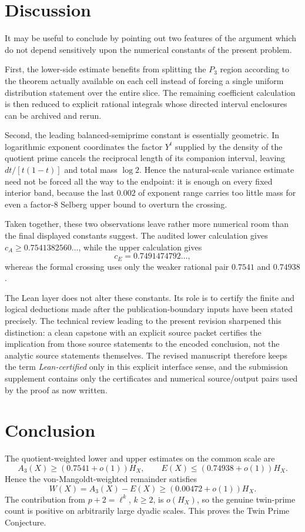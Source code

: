\documentclass{aomart}
\theoremstyle{definition}
\newcommand{\1}{\mathbf 1}
\begin{document}
\section{Discussion}

It may be useful to conclude by pointing out two features of the argument which do not depend sensitively upon the numerical constants of the present problem.

First, the lower-side estimate benefits from splitting the $P_3$ region according to the theorem actually available on each cell instead of forcing a single uniform distribution statement over the entire slice.  The remaining coefficient calculation is then reduced to explicit rational integrals whose directed interval enclosures can be archived and rerun.

Second, the leading balanced-semiprime constant is essentially geometric.  In logarithmic exponent coordinates the factor $Y^t$ supplied by the density of the quotient prime cancels the reciprocal length of its companion interval, leaving $dt/[t(1-t)]$ and total mass $\log2$.  Hence the natural-scale variance estimate need not be forced all the way to the endpoint: it is enough on every fixed interior band, because the last $0.002$ of exponent range carries too little mass for even a factor-$8$ Selberg upper bound to overturn the crossing.

Taken together, these two observations leave rather more numerical room than the final displayed constants suggest.  The audited lower calculation gives $c_A\ge0.7541382560\ldots$, while the upper calculation gives
\[
 c_E=0.7491474792\ldots,
\]
whereas the formal crossing uses only the weaker rational pair $0.7541$ and $0.74938$.

The Lean layer does not alter these constants.  Its role is to certify the finite and logical deductions made after the publication-boundary inputs have been stated precisely.  The technical review leading to the present revision sharpened this distinction: a clean capstone with an explicit source packet certifies the implication from those source statements to the encoded conclusion, not the analytic source statements themselves.  The revised manuscript therefore keeps the term \emph{Lean-certified} only in this explicit interface sense, and the submission supplement contains only the certificates and numerical source/output pairs used by the proof as now written.

\section{Conclusion}
The quotient-weighted lower and upper estimates on the common scale are
\[
 A_3(X)\ge(0.7541+o(1))H_X,
 \qquad
 E(X)\le(0.74938+o(1))H_X.
\]
Hence the von-Mangoldt-weighted remainder satisfies
\[
 W(X)=A_3(X)-E(X)\ge(0.00472+o(1))H_X.
\]
The contribution from $p+2=\ell^k$, $k\ge2$, is $o(H_X)$, so the genuine twin-prime count is positive on arbitrarily large dyadic scales.  This proves the Twin Prime Conjecture.
\end{document}
